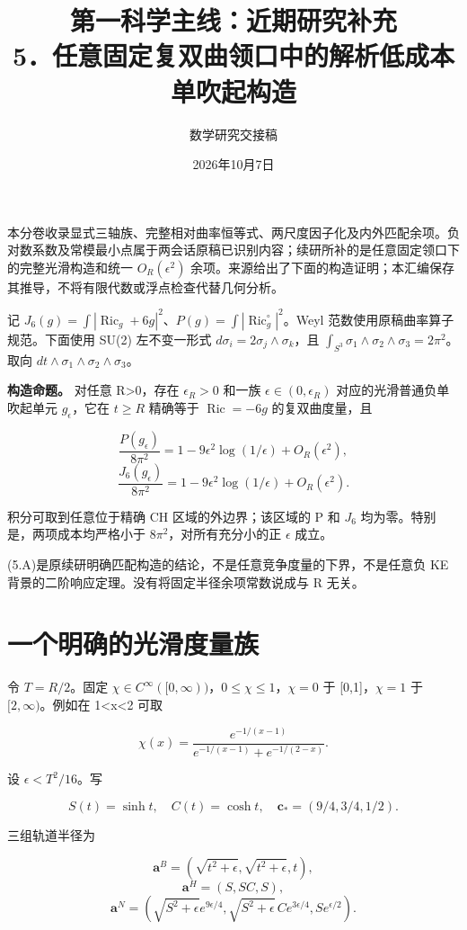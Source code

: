 \documentclass[UTF8,11pt,fontset=none]{ctexart}
\title{第一科学主线：近期研究补充\\[6pt]\large 5．任意固定复双曲领口中的解析低成本单吹起构造}
\author{数学研究交接稿}\date{2026年10月7日}
\theoremstyle{definition}
\theoremstyle{remark}
\begin{document}
\maketitle
\tableofcontents
\clearpage
本分卷收录显式三轴族、完整相对曲率恒等式、两尺度因子化及内外匹配余项。负对数系数及常模最小点属于两会话原稿已识别内容；续研所补的是任意固定领口下的完整光滑构造和统一 \(O_R(\epsilon^2)\) 余项。来源给出了下面的构造证明；本汇编保存其推导，不将有限代数或浮点检查代替几何分析。\cite{R04,B04}

记 \(J_6(g)=\int |\operatorname{Ric}_g+6g|^2\)、\(P(g)=\int |\operatorname{Ric}_g^{\circ}|^2\)。Weyl 范数使用原稿曲率算子规范。下面使用 SU(2) 左不变一形式 \(d\sigma _i=2\sigma _j\wedge \sigma _k\)，且 \(\int _{S^3}\sigma _1\wedge \sigma _2\wedge \sigma _3=2\pi ^2\)。取向 \(dt\wedge \sigma _1\wedge \sigma _2\wedge \sigma _3\)。

\textbf{构造命题。} 对任意 R\textgreater0，存在 \(\epsilon _R>0\) 和一族 \(\epsilon \in (0,\epsilon _R)\) 对应的光滑普通负单吹起单元 \(g_\epsilon\)，它在 \(t\ge R\) 精确等于 \(\operatorname{Ric}=-6g\) 的复双曲度量，且

\[
\frac{P(g_\epsilon)}{8\pi^2}
=1-9\epsilon^2\log(1/\epsilon)+O_R(\epsilon^2),
\] \[
\frac{J_6(g_\epsilon)}{8\pi^2}
=1-9\epsilon^2\log(1/\epsilon)+O_R(\epsilon^2).
\tag{5.A}
\]

积分可取到任意位于精确 CH 区域的外边界；该区域的 P 和 \(J_6\) 均为零。特别是，两项成本均严格小于 \(8\pi ^2\)，对所有充分小的正 \(\epsilon\) 成立。

(5.A)是原续研明确匹配构造的结论，不是任意竞争度量的下界，不是任意负 KE 背景的二阶响应定理。没有将固定半径余项常数说成与 R 无关。

\section{一个明确的光滑度量族}\label{v5-ux4e00ux4e2aux660eux786eux7684ux5149ux6ed1ux5ea6ux91cfux65cf}

令 \(T=R/2\)。固定 \(\chi \in C^\infty ([0,\infty ))\)，\(0\le \chi \le 1\)，\(\chi =0\) 于 {[}0,1{]}，\(\chi =1\) 于 \([2,\infty )\)。例如在 1\textless x\textless2 可取

\[
\chi(x)=\frac{e^{-1/(x-1)}}{e^{-1/(x-1)}+e^{-1/(2-x)}}.
\]

设 \(\epsilon <T^2/16\)。写

\[
S(t)=\sinh t,\quad C(t)=\cosh t,\quad
\mathbf c_*=(9/4,3/4,1/2).
\]

三组轨道半径为

\[
\mathbf a^B=(\sqrt{t^2+\epsilon},\sqrt{t^2+\epsilon},t),
\] \[
\mathbf a^H=(S,SC,S),
\] \[
\mathbf a^N=
\left(\sqrt{S^2+\epsilon}e^{9\epsilon/4},
\sqrt{S^2+\epsilon}\,C e^{3\epsilon/4},
S e^{\epsilon/2}\right).
\]
\end{document}
